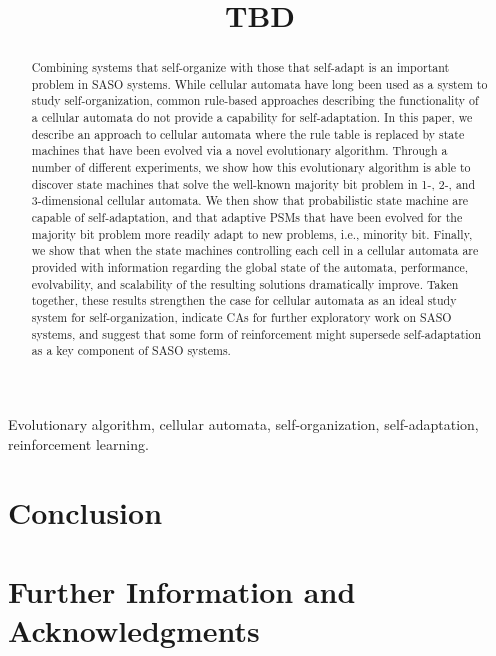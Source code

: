 \documentclass[10pt, conference, compsocconf]{IEEEtran}
\begin{document}
\sloppy

\title{TBD}

\author{
}
\maketitle

\begin{abstract}
Combining systems that self-organize with those that self-adapt is an important problem in SASO systems.  While cellular automata have long been used as a system to study self-organization, common rule-based approaches describing the functionality of a cellular automata do not provide a capability for self-adaptation.
%
In this paper, we describe an approach to cellular automata where the rule table is replaced by state machines that have been evolved via a novel evolutionary algorithm.  Through a number of different experiments, we show how this evolutionary algorithm is able to discover state machines that solve the well-known majority bit problem in 1-, 2-, and 3-dimensional cellular automata.
%
We then show that probabilistic state machine are capable of self-adaptation, and that adaptive PSMs that have been evolved for the majority bit problem more readily adapt to new problems, i.e., minority bit.
%
Finally, we show that when the state machines controlling each cell in a cellular automata are provided with information regarding the global state of the automata, performance, evolvability, and scalability of the resulting solutions dramatically improve.
%
Taken together, these results strengthen the case for cellular automata as an ideal study system for self-organization, indicate CAs for further exploratory work on SASO systems, and suggest that some form of reinforcement might supersede self-adaptation as a key component of SASO systems.
\end{abstract}

\begin{IEEEkeywords}
Evolutionary algorithm, cellular automata, self-organization, self-adaptation, reinforcement learning.
\end{IEEEkeywords}






\section{Conclusion}\label{s:conclusion}

\section*{Further Information and Acknowledgments}


%

\end{document}
